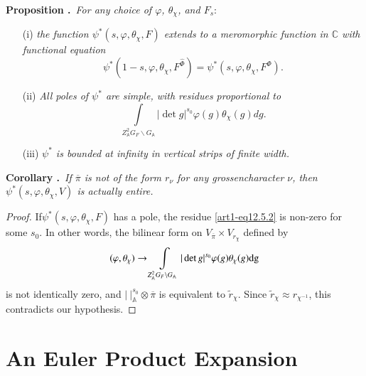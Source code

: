\medskip
\noindent
{\bf Proposition .\label{art1-prop12.5}}~{\em For any choice of $\varphi$, $\theta_{\chi}$, and $F_{s}:$}
\begin{itemize}
\item[(i)] {\em the function $\psi^{*}(s,\varphi,\theta_{\chi},F)$ extends to a meromorphic function in $\mathbb{C}$ with functional equation}
\setcounter{subsection}{5}
\setcounter{equation}{0}
\begin{equation}
\psi^{*}(1-s,\varphi,\theta_{\chi},F^{\widehat{\Phi}})=\psi^{*}(s,\varphi,\theta_{\chi},F^{\Phi}).\label{art1-eq12.5.1}
\end{equation}

\item[(ii)] {\em All poles of $\psi^{*}$ are simple, with residues proportional to}
\begin{equation}
\int\limits_{Z^{2}_{\mathbb{A}}G_{F}\backslash G_{\mathbb{A}}}|\det g|^{s_{0}}\varphi(g)\theta_{\chi}(g)dg.\label{art1-eq12.5.2}
\end{equation}

\item[(iii)] {\em $\psi^{*}$ is bounded at infinity in vertical strips of finite width.}
\end{itemize}

\medskip
\noindent
{\bf Corollary .\label{art1-coro12.6}}~{\em If $\overline{\pi}$ is not of the form $r_{\nu}$ for any grossencharacter $\nu$, then $\psi^{*}(s,\varphi,\theta_{\chi},V)$ is actually entire.}

\begin{proof}
If\pageoriginale $\psi^{*}(s,\varphi,\theta_{\chi},F)$ has a pole, the residue \eqref{art1-eq12.5.2} is non-zero for some $s_{0}$. In other words, the bilinear form on $V_{\overline{\pi}}\times V_{r_{\chi}}$ defined by
$$
(\varphi,\theta_{\chi})\to \int\limits_{Z^{2}_{\mathbb{A}}G_{F}\backslash G_{\mathbb{A}}}|\det g|^{s_{0}}\varphi(g)\theta_{\chi}(g)\mathrm{dg}
$$
is not identically zero, and $|~|^{s_{0}}_{\mathbb{A}}\otimes\overline{\pi}$ is equivalent to $\widetilde{r}_{\chi}$. Since $\widetilde{r}_{\chi}\approx r_{\chi^{-1}}$, this contradicts our hypothesis.
\end{proof}

\section{An Euler Product Expansion}\label{art1-sec13}

